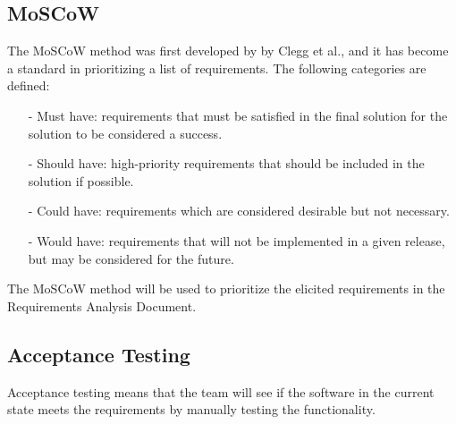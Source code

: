 \subsection{MoSCoW}
\label{sec:moscow}
The MoSCoW method was first developed by by Clegg et al.\cite{moscow}, and it has become a standard in prioritizing a list of requirements. The following categories are defined:
\begin{itemize}
\item[-] Must have: requirements that must be satisfied in the final solution for the solution to be considered a success.
\item[-] Should have: high-priority requirements that should be included in the solution if possible.
\item[-] Could have: requirements which are considered desirable but not necessary.
\item[-] Would have: requirements that will not be implemented in a given release, but may be considered for the future.
\end{itemize}
The MoSCoW method will be used to prioritize the elicited requirements in the Requirements Analysis Document.
\subsection{Acceptance Testing}
\label{sec:acc_test}
Acceptance testing means that the team will see if the software in the current state meets the requirements by manually testing the functionality.